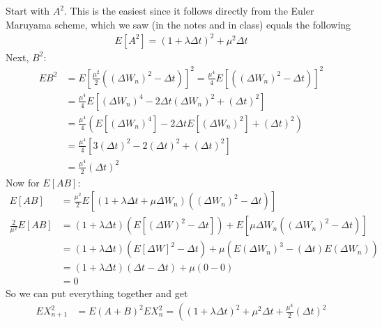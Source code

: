 \documentclass[12pt]{article}
\theoremstyle{plain}
\theoremstyle{definition}
\theoremstyle{remark}
\begin{document}
\begin{enumerate}
    Start with $A^2$. This is the easiest since it follows directly from
    the Euler Maruyama scheme, which we saw (in the notes and in class)
    equals the following
    \begin{align}
      \label{q3.a}
      E[A^2] = (1+\lambda \Delta t)^2 + \mu^2 \Delta t
    \end{align}
    Next, $B^2$:
    \begin{align*}
      EB^2
      &= E\left[\frac{\mu^2}{2} ((\Delta W_n)^2-\Delta t)\right]^2
      = \frac{\mu^4}{4} E\left[((\Delta W_n)^2-\Delta t)\right]^2\\
      &= \frac{\mu^4}{4}
        E\left[
        (\Delta W_n)^4 - 2 \Delta t (\Delta W_n)^2+(\Delta t)^2
        \right]\\
      &= \frac{\mu^4}{4}\left(
        E\left[ (\Delta W_n)^4 \right]
        - 2 \Delta t E[(\Delta W_n)^2]
        +(\Delta t)^2 \right)\\
      &= \frac{\mu^4}{4}
        \left[
        3 (\Delta t)^2
        - 2 (\Delta t)^2
        +(\Delta t)^2
        \right]\\
      &= \frac{\mu^4}{2} (\Delta t)^2
    \end{align*}
    Now for $E[AB]$:
    \begin{align*}
      E[AB]
        &=
        \frac{\mu^2}{2}
        E\left[
          \left( 1 + \lambda \Delta t + \mu \Delta W_n\right)
          \left((\Delta W_n)^2-\Delta t\right)
        \right] \\
        \frac{2}{\mu^2} E[AB]
        &=
        \left( 1 + \lambda \Delta t\right)\left(
          E[(\Delta W)^2 -\Delta t]
        \right)
        +
        E\left[
          \mu \Delta W_n
          \left((\Delta W_n)^2-\Delta t\right)
        \right]
        \\
        &=
        \left( 1 + \lambda \Delta t\right)\left(
          E[\Delta W]^2 -\Delta t
        \right)
        +
        \mu \left(
        E(\Delta W_n)^3
          -(\Delta t)E(\Delta W_n)
        \right)
        \\
        &=
        \left( 1 + \lambda \Delta t\right)\left(
          \Delta t -\Delta t
        \right)
        +
        \mu \left(
        0 - 0
        \right)
        \\
        &= 0
    \end{align*}
    So we can put everything together and get
    \begin{align*}
      EX_{n+1}^2
      &= E(A+B)^2 EX_n^2
      =
      \left(
      (1+\lambda\Delta t)^2 + \mu^2 \Delta t + \frac{\mu^4}{2}(\Delta t)^2

\end{align*}
\end{enumerate}
\end{document}
